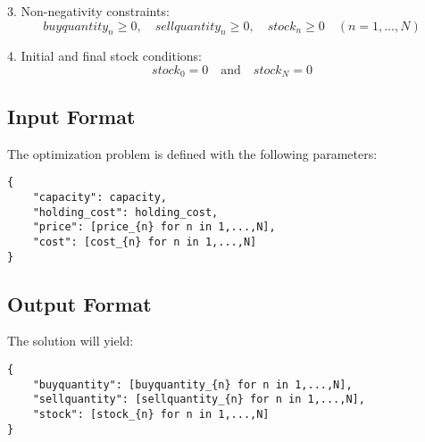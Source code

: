 \documentclass{article}
\begin{document}
3. Non-negativity constraints:
\[
buyquantity_n \geq 0, \quad sellquantity_n \geq 0, \quad stock_n \geq 0 \quad (n = 1, \ldots, N)
\]

4. Initial and final stock conditions:
\[
stock_0 = 0 \quad \text{and} \quad stock_N = 0
\]

\subsection*{Input Format}
The optimization problem is defined with the following parameters:
\begin{verbatim}
{
	"capacity": capacity,
	"holding_cost": holding_cost,
	"price": [price_{n} for n in 1,...,N],
	"cost": [cost_{n} for n in 1,...,N]
}
\end{verbatim}

\subsection*{Output Format}
The solution will yield:
\begin{verbatim}
{
	"buyquantity": [buyquantity_{n} for n in 1,...,N],
	"sellquantity": [sellquantity_{n} for n in 1,...,N],
	"stock": [stock_{n} for n in 1,...,N]
}
\end{verbatim}
\end{document}
